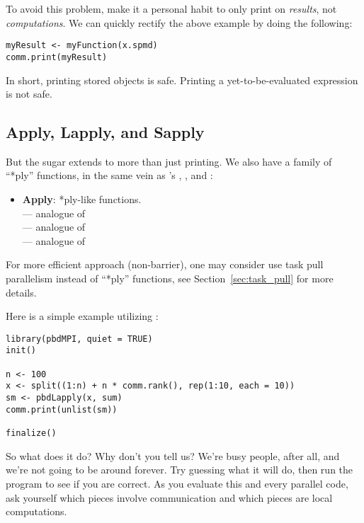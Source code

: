 To avoid this problem, make it a personal habit to only print on
\emph{results}, not \emph{computations}. We can quickly rectify the above
example by doing the following:
\begin{lstlisting}[language=rr,title=A Cautionary Tale of Printing in Parallel (3 of 3)]
myResult <- myFunction(x.spmd)
comm.print(myResult)
\end{lstlisting}

In short, printing stored objects is safe. Printing a yet-to-be-evaluated
expression is not safe.





\subsection{Apply, Lapply, and Sapply}\label{sec:pbdsugar2}

But the  sugar extends to more than just printing. We also have a
family of ``*ply'' functions, in the same vein as 's
, , and :
\begin{itemize}
  \item \textbf{Apply}: *ply-like functions.\\
   --- analogue of \\
   --- analogue of \\
   --- analogue of 
\end{itemize}
For more efficient approach (non-barrier), one may consider use task pull
parallelism instead of ``*ply'' functions, see Section~\ref{sec:task_pull}
for more details.

Here is a simple example utilizing :
\begin{lstlisting}[language=rr,title=Example 4]
library(pbdMPI, quiet = TRUE)
init()

n <- 100
x <- split((1:n) + n * comm.rank(), rep(1:10, each = 10))
sm <- pbdLapply(x, sum)
comm.print(unlist(sm))

finalize()
\end{lstlisting}

So what does it do? Why don't you tell us? We're busy people, after all,
and we're not going to be around forever. Try guessing what it will do,
then run the program to see if you are correct. As you evaluate this and
every parallel code, ask yourself which pieces involve communication and
which pieces are local computations.






